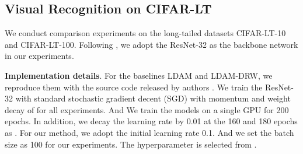 \subsection{Visual Recognition on CIFAR-LT}
We conduct comparison experiments on the long-tailed datasets CIFAR-LT-10 and CIFAR-LT-100. Following \cite{jamal2020rethinking, cui2019class}, we adopt the ResNet-32 \cite{resnet} as the backbone network in our experiments. 

\textbf{Implementation details}.
For the baselines LDAM and LDAM-DRW, we reproduce them with the source code released by authors \cite{cao2019learning}. We train the ResNet-32 \cite{resnet} with standard stochastic gradient decent (SGD) with momentum  and weight decay of  for all experiments. And We train the models on a single GPU for 200 epochs. In addition, we decay the learning rate by 0.01 at the 160 and 180 epochs as \cite{jamal2020rethinking}. For our method, we adopt the initial learning rate 0.1. And we set the batch size as 100 for our experiments. The hyperparameter  is selected from .

